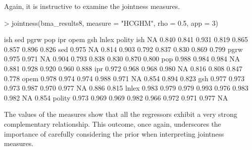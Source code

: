 \documentclass[a4paper]{article}
\begin{document}
Again, it is instructive to examine the jointness measures.
\begin{Schunk}
\begin{Sinput}
> jointness(bma_results8, measure = "HCGHM", rho = 0.5, app = 3)
\end{Sinput}
\begin{Soutput}
         ish   sed  pgrw   pop   ipr  opem   gsh lnlex polity
ish       NA 0.840 0.841 0.931 0.819 0.865 0.857 0.896  0.826
sed    0.975    NA 0.814 0.903 0.792 0.837 0.830 0.869  0.799
pgrw   0.975 0.971    NA 0.904 0.793 0.838 0.830 0.870  0.800
pop    0.988 0.984 0.984    NA 0.881 0.928 0.920 0.960  0.888
ipr    0.972 0.968 0.968 0.980    NA 0.816 0.808 0.847  0.778
opem   0.978 0.974 0.974 0.988 0.971    NA 0.854 0.894  0.823
gsh    0.977 0.973 0.973 0.987 0.970 0.977    NA 0.886  0.815
lnlex  0.983 0.979 0.979 0.993 0.976 0.983 0.982    NA  0.854
polity 0.973 0.969 0.969 0.982 0.966 0.972 0.971 0.977     NA
\end{Soutput}
\end{Schunk}
The values of the measures show that all the regressors exhibit a very strong complementary relationship.
This outcome, once again, underscores the importance of carefully considering the prior when interpreting jointness measures.
\end{document}
